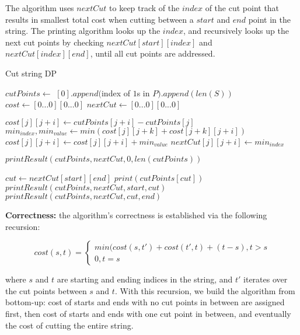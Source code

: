 \documentclass{article}
\begin{document}
\begin{description}
  The algorithm uses $nextCut$ to keep track of the $index$ of the cut point that results in smallest total cost when cutting between a $start$ and $end$ point in the string. The printing algorithm looks up the $index$, and recursively looks up the next cut points by checking $nextCut[start][index]$ and $nextCut[index][end]$, until all cut points are addressed.

  \begin{algorithm}[H]
  \caption{Cut string DP}
  \label{alg:cut-string-dp}
    \begin{algorithmic}[1]

      \State $cutPoints \gets $ $[0].append($index of $1$s in $P).append(len(S))$ 
      \State $cost \gets [0...0][0...0]$
      \State $nextCut \gets [0...0][0...0]$

          \State $cost[j][j+i] \gets cutPoints[j+i] - cutPoints[j]$
            \State $min_{index}, min_{value} \gets min(cost[j][j+k] + cost[j+k][j+i])$
          \EndFor
          \State $cost[j][j+i] \gets cost[j][j+i] + min_{value}$
          \State $nextCut[j][j+i] \gets min_{index}$
        \EndFor
      \EndFor

      \State $printResult(cutPoints, nextCut, 0, len(cutPoints))$
      \State {}
    \EndFunction

      \State $cut \gets nextCut[start][end]$
        \State $print(cutPoints[cut])$
      \EndIf
        \State \Return {}
      \EndIf
      \State $printResult(cutPoints, nextCut, start, cut)$
      \State $printResult(cutPoints, nextCut, cut, end)$
    \EndFunction

    \end{algorithmic}
  \end{algorithm}

  \textbf{Correctness:} the algorithm's correctness is established via the following recursion:

\[
  cost(s,t) = \begin{cases}
                min(cost(s, t') + cost(t',t) + (t - s), t > s \\
                0, t = s
              \end{cases}
\]

  where $s$ and $t$ are starting and ending indices in the string, and $t'$ iterates over the cut points between $s$ and $t$. With this recursion, we build the algorithm from bottom-up: cost of starts and ends with no cut points in between are assigned first, then cost of starts and ends with one cut point in between, and eventually the cost of cutting the entire string.


\end{description}
\end{document}
